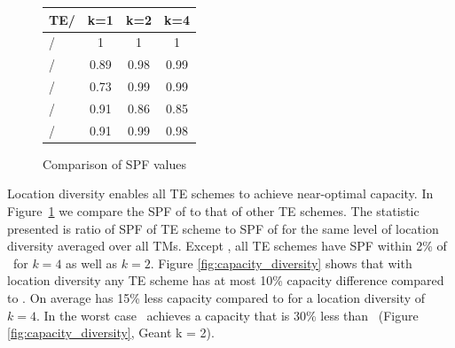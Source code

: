 \begin{figure}\footnotesize
\begin{center}
  \begin{tabular}{ l | c | c | c  }
TE/\opt{}&  k=1  & k=2 & k=4 \\ \hline
\opt{}/\opt{} & 1 & 1 & 1 \\ 
\mplsavg{}/ \opt{} & 0.89 & 0.98 & 0.99 \\
\optwt{}/\opt{} & 0.73 & 0.99 & 0.99 \\
\invcap{}/\opt{} & 0.91 & 0.86 & 0.85  \\
\cope{}/\opt{} & 0.91 & 0.99  & 0.98 \\  
  \end{tabular}
  \caption{Comparison of SPF values}
  \label{fig:cap_comparison}
\end{center}
\end{figure}
Location diversity enables all TE schemes to achieve near-optimal capacity. In Figure~\ref{fig:cap_comparison} we compare the SPF of \opt{} to that of other TE schemes. The statistic presented is ratio of SPF of TE scheme to SPF  of \opt{} for the same level of location diversity averaged over all TMs. Except \invcap{}, all TE schemes have SPF within 2\% of \opt\ for $k= 4$ as well as $k = 2$. Figure \ref{fig:capacity_diversity} shows that with location diversity any TE scheme has at most 10\% capacity difference compared to \opt. On average \invcap{} has 15\% less capacity compared to \opt{} for a location diversity of  $k = 4$.  In the worst case \invcap\ achieves a capacity that is 30\% less than \opt\ (Figure \ref{fig:capacity_diversity}, Geant k = 2).


